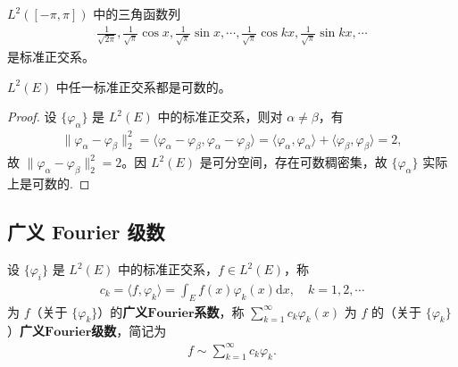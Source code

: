 \documentclass[../../main.tex]{subfiles}%
\begin{document}
\begin{example}
$L^2([-\pi, \pi])$ 中的三角函数列
\begin{align*}
\frac{1}{\sqrt{2\pi}}, \frac{1}{\sqrt{\pi}}\cos x, \frac{1}{\sqrt{\pi}}\sin x, \cdots, \frac{1}{\sqrt{\pi}}\cos kx, \frac{1}{\sqrt{\pi}}\sin kx, \cdots
\end{align*}
是标准正交系。
\end{example}

\begin{theorem}
$L^2(E)$ 中任一标准正交系都是可数的。
\end{theorem}
\begin{proof}

设 $\{\varphi_\alpha\}$ 是 $L^2(E)$ 中的标准正交系，则对 $\alpha \neq \beta$，有
\begin{align*}
\|\varphi_\alpha - \varphi_\beta\|_2^2 = \langle \varphi_\alpha - \varphi_\beta, \varphi_\alpha - \varphi_\beta \rangle = \langle \varphi_\alpha, \varphi_\alpha \rangle + \langle \varphi_\beta, \varphi_\beta \rangle = 2,
\end{align*}
故 $\|\varphi_\alpha - \varphi_\beta\|_2^2 = 2$。因 $L^2(E)$ 是可分空间，存在可数稠密集，故 $\{\varphi_\alpha\}$ 实际上是可数的.

\end{proof}


\subsection{广义 Fourier 级数}

\begin{definition}
设 $\{\varphi_i\}$ 是 $L^2(E)$ 中的标准正交系，$f \in L^2(E)$，称
\begin{align*}
c_k = \langle f, \varphi_k \rangle = \int_E f(x) \varphi_k(x) \mathrm{d}x, \quad k=1,2,\cdots
\end{align*}
为 $f$（关于 $\{\varphi_k\}$）的\textbf{广义}$\mathbf{Fourier}$\textbf{系数}，称 $\sum\limits_{k=1}^\infty c_k \varphi_k(x)$ 为 $f$ 的（关于 $\{\varphi_k\}$）\textbf{广义}$\mathbf{Fourier}$\textbf{级数}，简记为
\begin{align*}
f \sim \sum\limits_{k=1}^\infty c_k \varphi_k.
\end{align*}
\end{definition}
\end{document}
